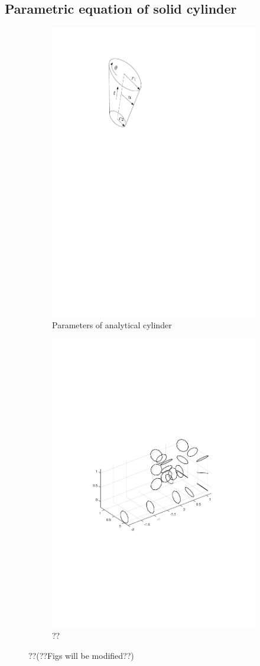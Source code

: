 \documentclass[12pt,a4]{article}
\begin{document}
\subsection{Parametric equation of solid cylinder}\label{app:parametric_u_v_solid_cyl}
\begin{figure}[ht!]
    \centering
    \begin{subfigure}{0.48\textwidth}
        \centering
        \includegraphics[width=0.3\linewidth]{figures/fig17a.pdf}
        \caption{Parameters of analytical cylinder \label{fig:cylparams}}
    \end{subfigure}%
    \begin{subfigure}{0.48\textwidth}
        \centering
        \includegraphics[width=0.75\linewidth]{figures/fig16.pdf}
        \caption{?? \label{fig:cylductmotion}}
    \end{subfigure}
    \caption{ ??(??Figs will be modified??)}
\end{figure}
\end{document}
